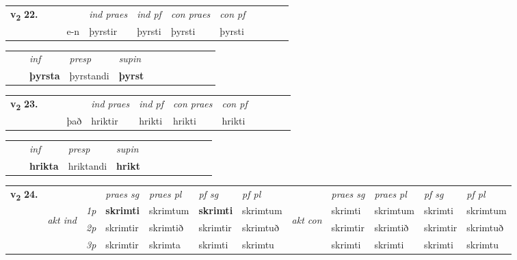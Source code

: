\begin{tabular}{llllllllllll}\toprule
\multirow{4}{*}{{{\textbf{v{\textsubscript{2}}} \Large{\textbf{22.}}}}}  & &  & &  \textit{ind praes} & \textit{ind pf} & \textit{con praes} & \textit{con pf} \\*
&  & & e-n & þyrstir & þyrsti & þyrsti & þyrsti \\*
\cmidrule{5-9}
\end{tabular}


\begin{tabular}{llllllllllll}
 & & \textit{inf}     & \textit{presp} & \textit{supin}       \\*
  & & \textbf{þyrsta}      & þyrstandi &  \textbf{þyrst}   \\*
\cmidrule{1-12}
\end{tabular}





\begin{tabular}{llllllllllll}\toprule
\multirow{4}{*}{{{\textbf{v{\textsubscript{2}}} \Large{\textbf{23.}}}}}  & &  & &  \textit{ind praes} & \textit{ind pf} & \textit{con praes} & \textit{con pf} \\*
&  & & það & hriktir & hrikti & hrikti & hrikti \\*
\cmidrule{5-9}
\end{tabular}


\begin{tabular}{llllllllllll}
 & & \textit{inf}     & \textit{presp} & \textit{supin}       \\*
  & & \textbf{hrikta}      & hriktandi &  \textbf{hrikt}   \\*
\cmidrule{1-12}
\end{tabular}



\begin{tabular}{llllllllllll} \toprule
\multirow{4}{*}{{{\textbf{v{\textsubscript{2}}} \Large{\textbf{24.}}}}}  & &   &  \textit{praes sg}  & \textit{praes pl}  &\textit{ pf sg} & \textit{pf pl} &  &  \textit{praes sg}  & \textit{praes pl}  & \textit{pf sg} & \textit{pf pl } \\*
	\cmidrule{4-7} \cmidrule{9-12}
 & \multirow{3}{*}{\begin{turn}{90}\textit{akt ind}\end{turn}} & {\textit{1p}} & \textbf{skrimti} & skrimtum    & \textbf{skrimti} & skrimtum & \multirow{3}{*}{\begin{turn}{90}\textit{akt con}\end{turn}} &skrimti & skrimtum & skrimti & skrimtum\\*
& &  {\textit{2p}} &  skrimtir  & skrimtið   & skrimtir & skrimtuð & & skrimtir & skrimtið & skrimtir & skrimtuð \\*
& &  {\textit{3p}} & skrimtir & skrimta   & skrimti & skrimtu & & skrimti & skrimti& skrimti & skrimtu  \\*
\cmidrule{4-7} \cmidrule{9-12}
\end{tabular}



